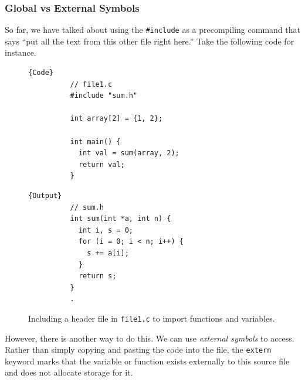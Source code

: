 \documentclass{article}
\begin{document}
    \subsubsection{Global vs External Symbols}

      So far, we have talked about using the \texttt{\#include} as a precompiling command that says ``put all the text from this other file right here.'' Take the following code for instance. 

      \begin{figure}[H]
        \centering 
        \noindent\begin{minipage}{.5\textwidth}
        \begin{lstlisting}[]{Code}
          // file1.c 
          #include "sum.h" 

          int array[2] = {1, 2}; 

          int main() {
            int val = sum(array, 2); 
            return val; 
          }
        \end{lstlisting}
        \end{minipage}
        \hfill
        \begin{minipage}{.49\textwidth}
        \begin{lstlisting}[]{Output}
          // sum.h 
          int sum(int *a, int n) {
            int i, s = 0; 
            for (i = 0; i < n; i++) {
              s += a[i]; 
            }
            return s; 
          }
          .
        \end{lstlisting}
        \end{minipage}
        \caption{Including a header file in \texttt{file1.c} to import functions and variables.}
        \label{fig:include_example}
      \end{figure}

      However, there is another way to do this. We can use \textit{external symbols} to access. Rather than simply copying and pasting the code into the file, the \texttt{extern} keyword marks that the variable or function exists externally to this source file and does not allocate storage for it. 
\end{document}
